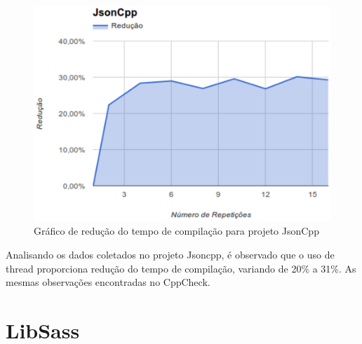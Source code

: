 \begin{figure}[h]
    \centering
        \includegraphics[keepaspectratio=true,scale=1]{figuras/jsoncpp.eps}
    \caption{Gráfico de redução do tempo de compilação para projeto JsonCpp}
    \label{jsoncpp}
\end{figure}

Analisando os dados coletados no projeto Jsoncpp, é observado
 que o uso de thread proporciona
 redução do tempo de compilação, variando de 20\% a 31\%.
As mesmas observações encontradas no CppCheck.

\section{LibSass}

